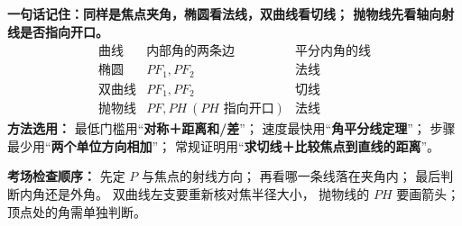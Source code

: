 \clearpage
\begin{summarybox}
\textbf{一句话记住：同样是焦点夹角，椭圆看法线，双曲线看切线；
抛物线先看轴向射线是否指向开口。}
\[
\begin{array}{c|c|c}
\text{曲线}&\text{内部角的两条边}&\text{平分内角的线}\\\hline
\text{椭圆}&PF_1,PF_2&\text{法线}\\
\text{双曲线}&PF_1,PF_2&\text{切线}\\
\text{抛物线}&PF,PH\ (PH\text{ 指向开口})&\text{法线}
\end{array}
\]
\textbf{方法选用：}
最低门槛用“\textbf{对称＋距离和/差}”；
速度最快用“\textbf{角平分线定理}”；
步骤最少用“\textbf{两个单位方向相加}”；
常规证明用“\textbf{求切线＋比较焦点到直线的距离}”。

\textbf{考场检查顺序：}
先定 $P$ 与焦点的射线方向；
再看哪一条线落在夹角内；
最后判断内角还是外角。
双曲线左支要重新核对焦半径大小，
抛物线的 $PH$ 要画箭头；顶点处的角需单独判断。
\end{summarybox}
